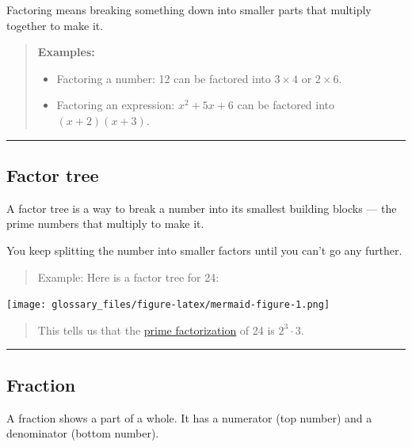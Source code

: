 \documentclass[
  letterpaper,
  DIV=11,
  numbers=noendperiod]{scrreprt}
\begin{document}
Factoring means breaking something down into smaller parts that multiply
together to make it.

\begin{quote}
\textbf{Examples:}

\begin{itemize}
\item
  Factoring a number: 12 can be factored into \(3 \times 4\) or
  \(2 \times 6\).
\item
  Factoring an expression: \(x^2 + 5x + 6\) can be factored into
  \((x + 2)(x + 3)\).
\end{itemize}
\end{quote}

\begin{center}\rule{0.5\linewidth}{0.5pt}\end{center}

\subsection*{Factor tree}\label{glossary-factor-tree}

A factor tree is a way to break a number into its smallest building
blocks --- the prime numbers that multiply to make it.

You keep splitting the number into smaller factors until you can't go
any further.

\begin{quote}
Example: Here is a factor tree for 24:
\end{quote}

\texttt{[image: glossary\_files/figure-latex/mermaid-figure-1.png]}

\begin{quote}
This tells us that the
\href{./glossary.html\#glossary-prime-factorization}{prime factorization}
of 24 is \(2^3 \cdot 3\).
\end{quote}

\begin{center}\rule{0.5\linewidth}{0.5pt}\end{center}

\subsection*{Fraction}\label{glossary-fraction}

A fraction shows a part of a whole. It has a numerator (top number) and
a denominator (bottom number).
\end{document}
